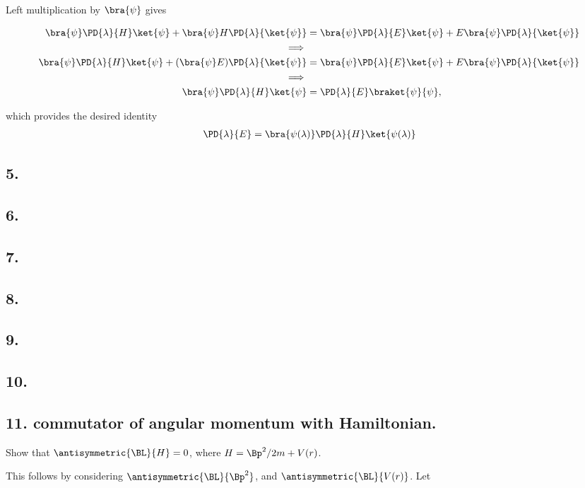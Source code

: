 Left multiplication by $\bra{\psi}$ gives

\begin{align*}
\bra{\psi}\PD{\lambda}{H} \ket{\psi} +\bra{\psi}H \PD{\lambda}{\ket{\psi}} &= \bra{\psi}\PD{\lambda}{E} \ket{\psi} +  E \bra{\psi}\PD{\lambda}{\ket{\psi} } \\
\implies \\
\bra{\psi}\PD{\lambda}{H} \ket{\psi} +(\bra{\psi}E) \PD{\lambda}{\ket{\psi}} &= \bra{\psi}\PD{\lambda}{E} \ket{\psi} +  E \bra{\psi}\PD{\lambda}{\ket{\psi} } \\
\implies \\
\bra{\psi}\PD{\lambda}{H} \ket{\psi} &= \PD{\lambda}{E} \braket{\psi}{\psi},
\end{align*}

which provides the desired identity
\begin{align}\label{eqn:desaiCh3:1}
\PD{\lambda}{E} 
= \bra{\psi(\lambda)}\PD{\lambda}{H} \ket{\psi(\lambda)}
\end{align}

\subsection{5. }
\subsection{6. }
\subsection{7. }
\subsection{8. }
\subsection{9. }
\subsection{10. }
\subsection{11. commutator of angular momentum with Hamiltonian.}

Show that $\antisymmetric{\BL}{H} = 0$, where $H = \Bp^2/2m + V(r)$.

This follows by considering $\antisymmetric{\BL}{\Bp^2}$, and $\antisymmetric{\BL}{V(r)}$.  Let

